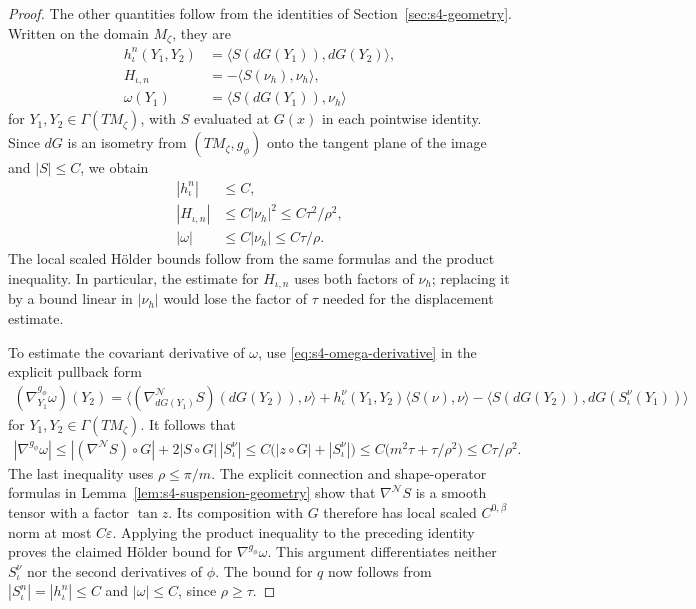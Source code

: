 \documentclass[a4paper,11pt,oneside,reqno]{amsart}
\numberwithin{equation}{section}
\theoremstyle{definition}
\begin{document}
\begin{proof}
    The other quantities follow from the identities of
    Section~\ref{sec:s4-geometry}. Written on the domain
    $M_\zeta$, they are
    \begin{align*}
        h_\iota^n(Y_1,Y_2)
          &=\bigl\langle S(dG(Y_1)),dG(Y_2)\bigr\rangle,\\
        H_{\iota,n}
          &=-\bigl\langle S(\nu_h),\nu_h\bigr\rangle,\\
        \omega(Y_1)
          &=\bigl\langle S(dG(Y_1)),\nu_h\bigr\rangle
    \end{align*}
    for $Y_1,Y_2\in\Gamma(TM_\zeta)$, with $S$
    evaluated at $G(x)$ in each pointwise identity.
    Since $dG$ is an isometry from $(TM_\zeta,g_\phi)$
    onto the tangent plane of the image and $|S|\leq C$,
    we obtain
    \begin{align*}
        |h_\iota^n|&\leq C,\\
        |H_{\iota,n}|&\leq C|\nu_h|^2
            \leq C\tau^2/\rho^2,\\
        |\omega|&\leq C|\nu_h|
            \leq C\tau/\rho.
    \end{align*}
    The local scaled H\"older bounds follow from the
    same formulas and the product inequality. In
    particular, the estimate for $H_{\iota,n}$ uses
    both factors of $\nu_h$; replacing it by a bound
    linear in $|\nu_h|$ would lose the factor of $\tau$
    needed for the displacement estimate.

    To estimate the covariant derivative of $\omega$,
    use \eqref{eq:s4-omega-derivative} in the explicit
    pullback form
    \begin{align*}
        (\nabla^{g_\phi}_{Y_1}\omega)(Y_2)
        =\bigl\langle
            (\nabla^{\mathcal N}_{dG(Y_1)}S)(dG(Y_2)),
            \nu\bigr\rangle
        +h_\iota^\nu(Y_1,Y_2)
            \langle S(\nu),\nu\rangle
          -\bigl\langle S(dG(Y_2)),
                dG(S_\iota^\nu(Y_1))\bigr\rangle
    \end{align*}
    for $Y_1,Y_2\in\Gamma(TM_\zeta)$. It follows that
    \begin{align*}
        |\nabla^{g_\phi}\omega|
        \leq |(\nabla^{\mathcal N}S)\circ G|
               +2|S\circ G|\,|S_\iota^\nu|
        \leq C\bigl(|z\circ G|+|S_\iota^\nu|\bigr)
        \leq C\bigl(m^2\tau+\tau/\rho^2\bigr)
         \leq C\tau/\rho^2.
    \end{align*}
    The last inequality uses $\rho\leq\pi/m$.
    The explicit connection and shape-operator formulas
    in Lemma~\ref{lem:s4-suspension-geometry} show that
    $\nabla^{\mathcal N}S$ is a smooth tensor with a
    factor $\tan z$. Its composition with $G$ therefore
    has local scaled $C^{0,\beta}$ norm at most
    $C\varepsilon$. Applying the product inequality to
    the preceding identity proves the claimed
    H\"older bound for $\nabla^{g_\phi}\omega$.
    This argument differentiates neither
    $S_\iota^\nu$ nor the second derivatives of $\phi$.
    The bound for $q$ now follows from
    $|S_\iota^n|=|h_\iota^n|\leq C$ and
    $|\omega|\leq C$, since $\rho\geq\tau$.


\end{proof}
\end{document}
